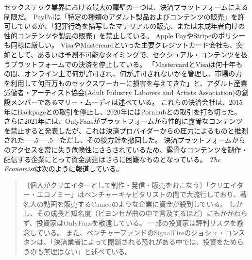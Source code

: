 \documentclass[paper=a4,book,openany]{jlreq}
\newcommand{\ig}[1]{}           %
\def\DDASH{―\kern-.5\zw―\kern-.5\zw―} %
\begin{document}
セックステック業界における最大の障壁の一つは、決済プラットフォームによる制限だ。
PayPalは「特定の種類のアダルト製品およびコンテンツの販売」を許可しているが、「犯罪行為を描写したマテリアルの販売、または未成年者向けの性的コンテンツや製品の販売」を禁止している\citep{fearnow20:_porn_indus_stars_turn_crypt}。
Apple PayやStripeのポリシーも同様に厳しい。
VisaやMastercardといった主要クレジットカード会社も、突如として、あるいは予測不可能なタイミングで、セクシュアル・コンテンツを扱うプラットフォームでの決済を停止している。
「MastercardとVisaは何十年もの間、オンライン上で何が許可され、何が許可されないかを管理し、市場の力を利用して何百万ものセックスワーカーに損害を与えてきた」と、アダルト産業労働者・アーティスト協会(Adult Industry Laborers and Artists Association)の創設メンバーであるマリー・ムーディ\ig{Mary Moody}は述べている\citep{cole21:_i_felt_betray}。
これらの決済会社は、2015年にBackpageとの取引を停止し、2020年にはPornhubとの取引を打ち切った。
さらに2021年には、OnlyFansがプラットフォームから性的に露骨なコンテンツを禁止すると発表したが、これは決済プロバイダーからの圧力によるものと推測された{\DDASH}ただし、その後方針を撤回した。
決済プラットフォームからのアクセスを常に失う危険性にさらされているため、露骨なコンテンツを制作・配信する企業にとって資金調達はさらに困難なものとなっている\citep{sesta18:_platf_which_discr_sex_worker}。
\emph{The Economist}は次のように報道している。

\begin{quote}
〔個人がクリエイターとして制作・発信・販売をおこなう〕「クリエイター・エコノミー」はベンチャーキャピタリストの間で大流行しており、著名人の動画を販売するCameoのような企業に資金が殺到している。
しかし、その成長と知名度（ビヨンセが曲の中で言及するほど）にもかかわらず、投資家はOnlyFansを敬遠している。
一部の投資家は評判リスクを懸念している。
また、ベンチャーファンドのSignalFireのジョシュ・コンスタンは、「決済業者によって閉鎖される恐れがある中では、投資をためらうのも無理はない」と述べている。
\citep{economist21:_onlyf_u_turns_its_porn_ban}
\end{quote}
\end{document}
